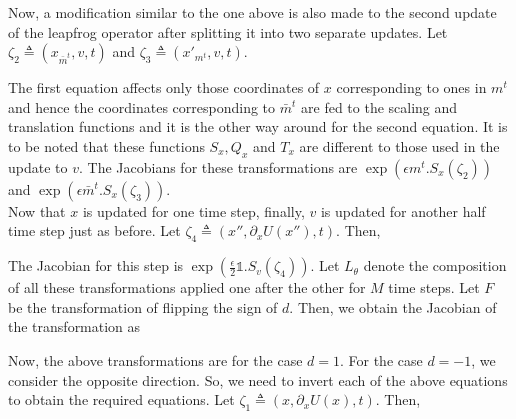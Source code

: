 \documentclass[letterpaper,english,10pt]{article}
\begin{document}
Now, a modification similar to the one above is also made to the second update of the leapfrog operator after splitting it into two separate updates. Let $\zeta_2 \triangleq (x_{\bar{m}^t}, v, t)$ and $\zeta_3  \triangleq (x'_{m^t}, v, t)$.


The first equation affects only those coordinates of $x$ corresponding to ones in $m^t$ and hence the coordinates corresponding to $\bar{m}^t$ are fed to the scaling and translation functions and it is the other way around for the second equation. It is to be noted that these functions $S_x, Q_x$ and $T_x$ are different to those used in the update to $v$. The Jacobians for these transformations are $\exp(\epsilon m^t.S_x(\zeta_2))$ and $\exp(\epsilon \bar{m}^t.S_x(\zeta_3))$. \\

Now that $x$ is updated for one time step, finally, $v$ is updated for another half time step just as before. Let $\zeta_4 \triangleq (x'', \partial_x U(x''), t)$. Then,


The Jacobian for this step is $\exp(\frac{\epsilon}{2} \mathbb{1}.S_v(\zeta_4))$. Let $L_\theta$ denote the composition of all these transformations applied one after the other for $M$ time steps. Let $F$ be the transformation of flipping the sign of $d$. Then, we obtain the Jacobian of the transformation as


Now, the above transformations are for the case $d=1$. For the case $d=-1$, we consider the opposite direction. So, we need to invert each of the above equations to obtain the required equations. Let $\zeta_1 \triangleq (x, \partial_x U(x), t)$. Then,
\end{document}
